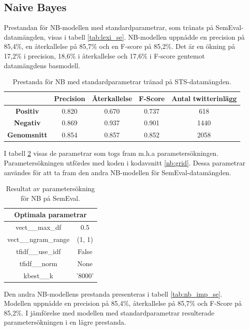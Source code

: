 \documentclass{kaumasters} %
\begin{document}
\subsection{Naive Bayes}
Prestandan för  NB-modellen med standardparametrar, som tränats på SemEval-datamängden, visas i tabell \ref{tab:lexi_se}. NB-modellen uppnådde en precision på 85,4\%, en återkallelse på 85,7\% och en F-score på 85,2\%. Det är en ökning på 17,2\% i precision,  18,6\% i återkallelse och 17,6\% i F-score gentemot datamängdens basmodell.

\begin{table}[H]
\centering
\caption{Prestanda för NB med standardparametrar tränad på STS-datamängden.}
\label{tab:nb_base_se}
    \begin{tabular}{ccccc}
    \toprule
     & \textbf{Precision} & \textbf{Återkallelse} & \textbf{F-Score} & \textbf{Antal twitterinlägg}  \\
    \midrule
    \textbf{Positiv} & 0.820 & 0.670 & 0.737 & 618 \\
    \textbf{Negativ} & 0.869 & 0.937 & 0.901 & 1440 \\
    \midrule
    \textbf{Genomsnitt} & 0.854 & 0.857 & 0.852  & 2058 \\
    \bottomrule
\end{tabular}
\end{table}

I tabell \ref{tab:nb_grid_se} visas de parametrar som togs fram m.h.a parametersökningen. Parametersökningen utfördes med koden i kodavsnitt \ref{nb:grid}. Dessa parametrar användes för att ta fram den andra NB-modellen för SemEval-datamängden.

\begin{table}[H]
\centering
\caption{Resultat av parametersökning för NB på SemEval.}
\label{tab:nb_grid_se}
    \begin{tabular}{cc}
    \toprule
    \multicolumn{2}{c}{\textbf{Optimala parametrar}} \\
    \midrule
    vect\_\_max\_df & 0.5  \\
    vect\_\_ngram\_range & (1, 1)  \\
    tfidf\_\_use\_idf & False  \\
    tfidf\_\_norm & None  \\
    kbest\_\_k & '8000' \\
    \bottomrule
\end{tabular}
\end{table}

Den andra NB-modellens prestanda presenteras i tabell \ref{tab:nb_imp_se}. Modellen uppnådde en precision på 85,4\%, återkallelse på 85,7\% och F-Score på 85,2\%. I jämförelse med modellen med standardparametrar resulterade parametersökningen i  en lägre prestanda.  
\end{document}
